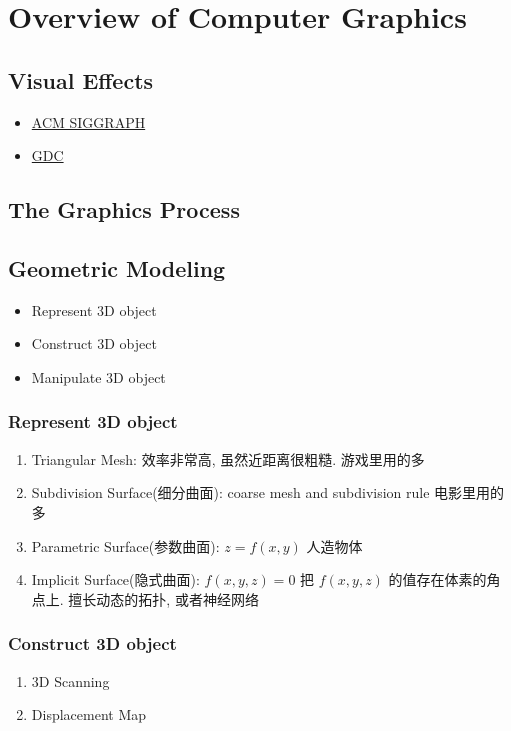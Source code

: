 \newpage
\section{Overview of Computer Graphics}
\subsection{Visual Effects}
\begin{itemize}
    \item \href{www.siggraph.org}{ACM SIGGRAPH}
    \item \href{www.gdconf.com}{GDC}
\end{itemize}

\subsection{The Graphics Process}

\subsection{Geometric Modeling}
\begin{itemize}
    \item Represent 3D object
    \item Construct 3D object
    \item Manipulate 3D object
\end{itemize}

\subsubsection{Represent 3D object}
\begin{enumerate}
    \item Triangular Mesh: 效率非常高, 虽然近距离很粗糙.
    \subitem 游戏里用的多
    \item Subdivision Surface(细分曲面): 
    \subitem coarse mesh and subdivision rule
    \subitem 电影里用的多
    \item Parametric Surface(参数曲面): $z=f(x,y)$
    \subitem 人造物体
    \item Implicit Surface(隐式曲面): $f(x,y,z)=0$
    \subitem 把 $f(x,y,z)$ 的值存在体素的角点上.
    \subitem 擅长动态的拓扑, 或者神经网络
\end{enumerate}

\subsubsection{Construct 3D object}%
\begin{enumerate}
    \item 3D Scanning
    \item Displacement Map 
\end{enumerate}

